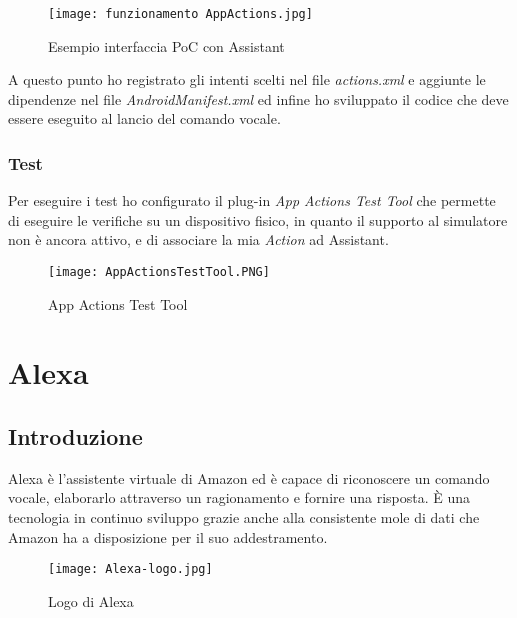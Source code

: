 		\pagebreak
		
		\begin{figure}[htbp]
			\begin{center}
				\texttt{[image: funzionamento AppActions.jpg]}
				\caption{Esempio interfaccia PoC con Assistant}
			\end{center}
		\end{figure}
	
		A questo punto ho registrato gli intenti scelti nel file \emph{actions.xml} e aggiunte le dipendenze nel file \emph{AndroidManifest.xml} ed infine ho sviluppato il codice che deve essere eseguito al lancio del comando vocale.
	
		\subsubsection{Test} \mbox{}
		Per eseguire i test ho configurato il plug-in \emph{App Actions Test Tool} che permette di eseguire le verifiche su un dispositivo fisico, in quanto il supporto al simulatore non è ancora attivo, e di associare la mia \emph{Action} ad Assistant.
		
		\begin{figure}[htbp]
			\begin{center}
				\texttt{[image: AppActionsTestTool.PNG]}
				\caption{App Actions Test Tool}
			\end{center}
		\end{figure}
		
\section{Alexa}
	\subsection{Introduzione}
	Alexa è l'assistente virtuale di Amazon ed è capace di riconoscere un comando vocale, elaborarlo attraverso un ragionamento e fornire una risposta. È una tecnologia in continuo sviluppo grazie anche alla consistente mole di dati che Amazon ha a disposizione per il suo addestramento.
	
	\begin{figure}[htbp]
		\begin{center}
			\texttt{[image: Alexa-logo.jpg]}
			\caption{Logo di Alexa}
		\end{center}
	\end{figure}
	
